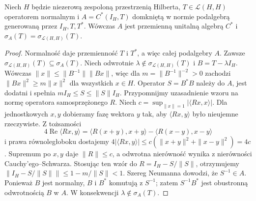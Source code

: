 \begin{lemat}
\label{lem:spectral-permanence32}
Niech $H$ będzie niezerową zespoloną przestrzenią Hilberta,
$T\in\mathcal L(H,H)$ operatorem normalnym i
$A=C^*(I_H,T)$ domkniętą w normie podalgebrą generowaną
przez $I_H,T,T^*$. Wówczas $A$ jest przemienną unitalną
algebrą $C^*$ i $\sigma_A(T)=\sigma_{\mathcal L(H,H)}(T)$.
\end{lemat}
\begin{proof}
Normalność daje przemienność $T$ i $T^*$, a więc całej
podalgebry $A$. Zawsze $\sigma_{\mathcal L(H,H)}(T)\subseteq\sigma_A(T)$.
Niech odwrotnie $\lambda\notin\sigma_{\mathcal L(H,H)}(T)$ i
$B=T-\lambda I_H$. Wówczas $\|x\|\le\|B^{-1}\|\|Bx\|$, więc dla
$m=\|B^{-1}\|^{-2}>0$ zachodzi
$\|Bx\|^2\geq m\|x\|^2$ dla wszystkich $x\in H$.
Operator $S=B^*B$ należy do $A$, jest dodatni i spełnia
$mI_H\leq S\leq\|S\|I_H$. Przypomnijmy uzasadnienie wzoru na normę operatora
samosprzężonego $R$. Niech
$c=\sup_{\|x\|=1}|\langle Rx,x\rangle|$.
Dla jednostkowych $x,y$ dobieramy fazę wektora $y$ tak,
aby $\langle Rx,y\rangle$ było nieujemne rzeczywiste.
Z tożsamości
\[
4\operatorname{Re}\langle Rx,y\rangle
=\langle R(x+y),x+y\rangle-\langle R(x-y),x-y\rangle
\]
i prawa równoległoboku dostajemy
$4|\langle Rx,y\rangle|\le c(\|x+y\|^2+\|x-y\|^2)=4c$.
Supremum po $x,y$ daje $\|R\|\le c$, a odwrotna
nierówność wynika z nierówności Cauchy'ego--Schwarza.
Stosując ten wzór do $R=I_H-S/\|S\|$, otrzymujemy
$\|I_H-S/\|S\|\|\leq1-m/\|S\|<1$.
Szereg Neumanna dowodzi, że $S^{-1}\in A$. Ponieważ $B$ jest
normalny, $B$ i $B^*$ komutują z $S^{-1}$; zatem
$S^{-1}B^*$ jest obustronną odwrotnością $B$ w $A$.
W konsekwencji $\lambda\notin\sigma_A(T)$.
\end{proof}

